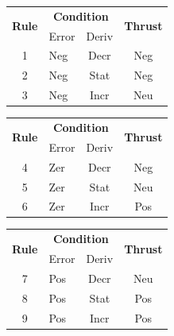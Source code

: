 \documentclass{article}[11pt]
\begin{document}
\begin{center}
\hspace*{-1.3cm}\begin{tabular}{|c|l|c|c|}
    \hline
    \multirow{2}{*}{\bfseries Rule} & 
    \multicolumn{2}{|c|}{\bfseries Condition} & \multirow{2}{*}{\bfseries Thrust} \\ \cline{2-3} & Error & Deriv& \\ \hline
    1 & Neg & Decr & Neg\\
    2 & Neg & Stat & Neg\\
    3 & Neg & Incr & Neu\\
    \hline
\end{tabular}
\hfill
\begin{tabular}{|c|l|c|c|}
    \hline
    \multirow{2}{*}{\bfseries Rule} & 
    \multicolumn{2}{|c|}{\bfseries Condition} & \multirow{2}{*}{\bfseries Thrust} \\ \cline{2-3} & Error & Deriv& \\ \hline
    4 & Zer & Decr & Neg\\
    5 & Zer & Stat & Neu\\
    6 & Zer & Incr & Pos\\
    \hline
\end{tabular}
\hfill
\begin{tabular}{|c|l|c|c|}
    \hline
    \multirow{2}{*}{\bfseries Rule} & 
    \multicolumn{2}{|c|}{\bfseries Condition} & \multirow{2}{*}{\bfseries Thrust} \\ \cline{2-3} & Error & Deriv& \\ \hline
    7 & Pos & Decr & Neu\\
    8 & Pos & Stat & Pos\\
    9 & Pos & Incr & Pos\\
    \hline
\end{tabular}
\end{center}
\end{document}
